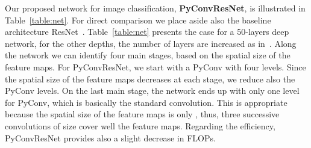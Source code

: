 \documentclass{article}
\begin{document}
Our proposed network for image classification, {\bf PyConvResNet}, is illustrated in Table~\ref{table:net}. For direct comparison we place aside also the baseline architecture ResNet~\cite{he2016deep}.  Table~\ref{table:net} presents the case for a 50-layers deep network, for the other depths, the number of layers are increased as in~\cite{he2016deep}. Along the network we can identify four main stages, based on the spatial size of the feature maps. For PyConvResNet, we start with a PyConv with four levels. Since the spatial size of the feature maps decreases at each stage, we reduce also the PyConv levels. On the last main stage, the network ends up with only one level for PyConv, which is basically the standard convolution. This is appropriate because the spatial size of the feature maps is only , thus, three successive convolutions  of  size  cover well the feature maps.  Regarding the efficiency, PyConvResNet provides also a slight decrease in FLOPs.
\end{document}
